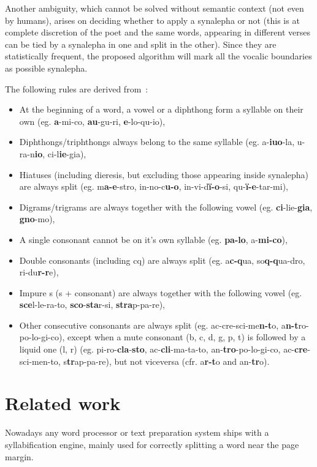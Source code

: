 Another ambiguity, which cannot be solved without semantic context (not even by humans), arises on deciding whether to apply a synalepha or not (this is at complete discretion of the poet and the same words, appearing in different verses can be tied by a synalepha in one and split in the other).
Since they are statistically frequent, the proposed algorithm will mark all the vocalic boundaries as possible synalepha.

The following rules are derived from~\cite{serianni,sensini}:
\begin{itemize}
	\item At the beginning of a word, a vowel or a diphthong form a syllable on their own (eg. \textbf{a}-mi-co, \textbf{au}-gu-ri, \textbf{e}-lo-qu-io),
	\item Diphthongs/triphthongs always belong to the same syllable (eg. a-\textbf{iuo}-la, u-ra-n\textbf{io}, ci-l\textbf{ie}-gia),
	\item Hiatuses (including dieresis, but excluding those appearing inside synalepha) are always split (eg. m\textbf{a-e}-stro, in-no-c\textbf{u-o}, in-vi-d\textbf{ï-o}-si, qu-\textbf{ï-e}-tar-mi),
	\item Digrams/trigrams are always together with the following vowel (eg. \textbf{ci}-lie-\textbf{gia}, \textbf{gno}-mo),
	\item A single consonant cannot be on it's own syllable (eg. \textbf{pa-lo}, a-\textbf{mi-co}),
	\item Double consonants (including cq) are always split (eg. a\textbf{c-q}ua, so\textbf{q-q}ua-dro, ri-du\textbf{r-r}e),
	\item Impure s (s + consonant) are always together with the following vowel (eg. \textbf{sce}l-le-ra-to, \textbf{sco}-\textbf{sta}r-si, \textbf{stra}p-pa-re),
	\item Other consecutive consonants are always split (eg. ac-cre-sci-me\textbf{n-t}o, a\textbf{n-t}ro-po-lo-gi-co), except when a mute consonant (b, c, d, g, p, t) is followed by a liquid one (l, r) (eg. pi-ro-\textbf{cla}-\textbf{sto}, ac-\textbf{cli}-ma-ta-to, an-\textbf{tro}-po-lo-gi-co, ac-\textbf{cre}-sci-men-to, s\textbf{tr}ap-pa-re), but not viceversa (cfr. a\textbf{r-t}o and an-\textbf{tr}o).
\end{itemize}

\section{Related work}
Nowadays any word processor or text preparation system ships with a syllabification engine, mainly used for correctly splitting a word near the page margin.

